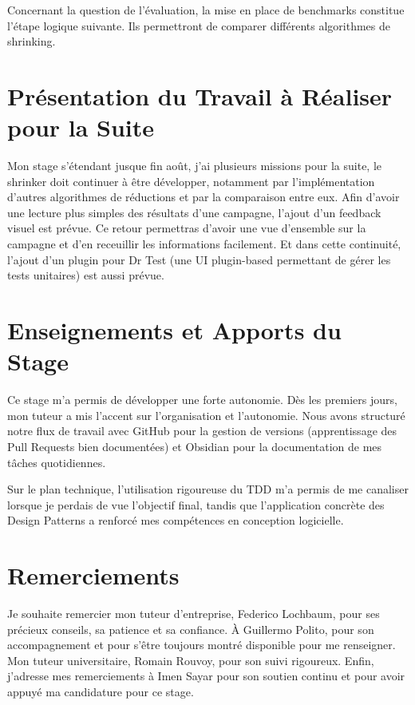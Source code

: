 \documentclass[11pt,a4paper]{report}
\begin{document}
Concernant la question de l'évaluation, la mise en place de benchmarks 
constitue l'étape logique suivante. Ils permettront de comparer différents 
algorithmes de shrinking. 

\section{Présentation du Travail à Réaliser pour la Suite}
Mon stage s'étendant jusque fin août, j'ai plusieurs missions pour la suite, le shrinker doit
continuer à être développer, notamment par l'implémentation d'autres algorithmes de réductions
et par la comparaison entre eux. 
Afin d'avoir une lecture plus simples des résultats d'une campagne, l'ajout d'un feedback visuel
est prévue. Ce retour permettras d'avoir une vue d'ensemble sur la campagne et d'en receuillir les informations
facilement. 
Et dans cette continuité, l'ajout d'un plugin pour Dr Test (une UI plugin-based permettant de gérer 
les tests unitaires) est aussi prévue.  

\section{Enseignements et Apports du Stage}
Ce stage m'a permis de développer une forte autonomie. Dès les premiers jours, 
mon tuteur a mis l'accent sur l'organisation et l'autonomie.
Nous avons structuré notre flux de travail avec GitHub pour la gestion de 
versions (apprentissage des Pull Requests bien documentées) 
et Obsidian pour la documentation de mes tâches quotidiennes. 

Sur le plan technique, l'utilisation rigoureuse du TDD m'a permis de me canaliser 
lorsque je perdais de vue l'objectif final, tandis que 
l'application concrète des Design Patterns a renforcé mes compétences en 
conception logicielle.

\section{Remerciements}
Je souhaite remercier mon tuteur d'entreprise, Federico Lochbaum, pour ses 
précieux conseils, sa patience et sa confiance.  À Guillermo Polito, pour son accompagnement 
et pour s'être toujours montré disponible pour me renseigner. Mon tuteur universitaire, 
Romain Rouvoy, pour son suivi rigoureux. Enfin, j'adresse mes remerciements 
à Imen Sayar pour son soutien continu et pour avoir appuyé ma candidature 
pour ce stage.
\end{document}
